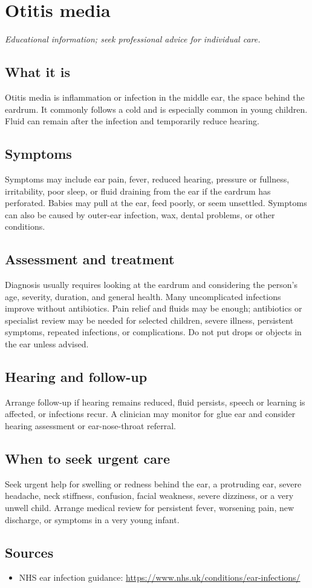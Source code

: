 \chapter{Otitis media}

\medskip
\noindent\textit{Educational information; seek professional advice for individual care.}

\section*{What it is}
Otitis media is inflammation or infection in the middle ear, the space behind the eardrum. It commonly follows a cold and is especially common in young children. Fluid can remain after the infection and temporarily reduce hearing.

\section*{Symptoms}
Symptoms may include ear pain, fever, reduced hearing, pressure or fullness, irritability, poor sleep, or fluid draining from the ear if the eardrum has perforated. Babies may pull at the ear, feed poorly, or seem unsettled. Symptoms can also be caused by outer-ear infection, wax, dental problems, or other conditions.

\section*{Assessment and treatment}
Diagnosis usually requires looking at the eardrum and considering the person’s age, severity, duration, and general health. Many uncomplicated infections improve without antibiotics. Pain relief and fluids may be enough; antibiotics or specialist review may be needed for selected children, severe illness, persistent symptoms, repeated infections, or complications. Do not put drops or objects in the ear unless advised.

\section*{Hearing and follow-up}
Arrange follow-up if hearing remains reduced, fluid persists, speech or learning is affected, or infections recur. A clinician may monitor for glue ear and consider hearing assessment or ear-nose-throat referral.

\section*{When to seek urgent care}
Seek urgent help for swelling or redness behind the ear, a protruding ear, severe headache, neck stiffness, confusion, facial weakness, severe dizziness, or a very unwell child. Arrange medical review for persistent fever, worsening pain, new discharge, or symptoms in a very young infant.

\section*{Sources}
\begin{itemize}
\item NHS ear infection guidance: \url{https://www.nhs.uk/conditions/ear-infections/}
\end{itemize}
